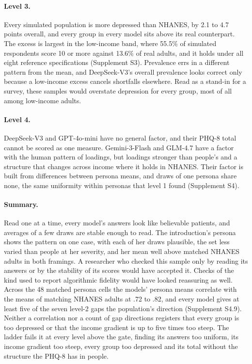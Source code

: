 \paragraph{Level 3.}
Every simulated population is more depressed than NHANES, by 2.1 to 4.7 points overall, and every group in every model sits above its real counterpart. %
The excess is largest in the low-income band, where 55.5\% of simulated respondents score 10 or more against 13.6\% of real adults, and it holds under all eight reference specifications (Supplement S3). %
Prevalence errs in a different pattern from the mean, and DeepSeek-V3's overall prevalence looks correct only because a low-income excess cancels shortfalls elsewhere. %
Read as a stand-in for a survey, these samples would overstate depression for every group, most of all among low-income adults.

\paragraph{Level 4.}
DeepSeek-V3 and GPT-4o-mini have no general factor, and their PHQ-8 total cannot be scored as one measure. %
Gemini-3-Flash and GLM-4.7 have a factor with the human pattern of loadings, but loadings stronger than people's and a structure that changes across income where it holds in NHANES. %
Their factor is built from differences between persona means, and draws of one persona share none, the same uniformity within personas that level 1 found (Supplement S4). %

\paragraph{Summary.}
Read one at a time, every model's answers look like believable patients, and averages of a few draws are stable enough to read.
The introduction's persona shows the pattern on one case, with each of her draws plausible, the set less varied than people at her severity, and her mean well above matched NHANES adults in both framings. %
A researcher who checked this sample only by reading its answers or by the stability of its scores would have accepted it.
Checks of the kind used to report algorithmic fidelity would have looked reassuring as well.
Across the 48 matched persona cells the models' persona means correlate with the means of matching NHANES adults at .72 to .82, and every model gives at least five of the seven level-2 gaps the population's direction (Supplement S4.9). %
Neither a correlation nor a count of gap directions registers that every group is too depressed or that the income gradient is up to five times too steep.
The ladder fails it at every level above the gate, finding its answers too uniform, its income gradient too steep, every group too depressed and its total without the structure the PHQ-8 has in people.

